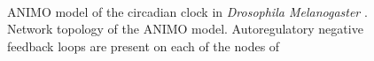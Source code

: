 \begin{figure}[!htpb]
\begin{center}
\ %
{}\
\end{center}
\caption{ANIMO model of the circadian clock in \emph{Drosophila Melanogaster} {\bfseries \protect{}}.
Network topology of the ANIMO model. Autoregulatory negative feedback loops are present on each of the nodes of
}
\end{figure}
